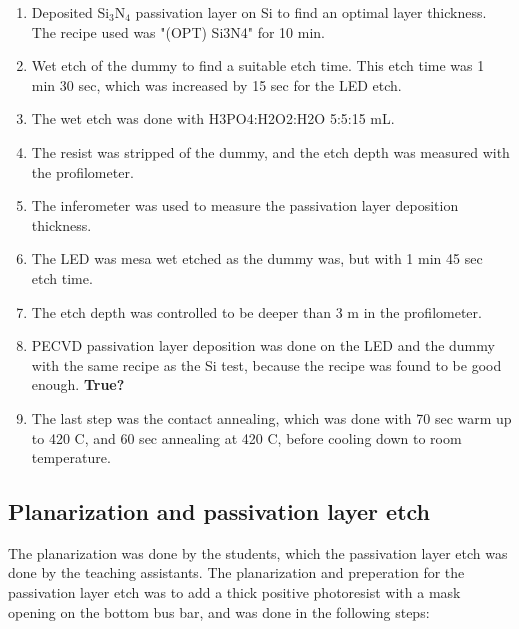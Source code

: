 \begin{enumerate}
    \item Deposited Si$_3$N$_4$ passivation layer on Si to find an optimal layer thickness. The recipe used was "(OPT) Si3N4" for 10 min.
    \item Wet etch of the dummy to find a suitable etch time. This etch time was 1 min 30 sec, which was increased by 15 sec for the LED etch.
    \item The wet etch was done with H3PO4:H2O2:H2O 5:5:15 mL.
    \item The resist was stripped of the dummy, and the etch depth was measured with the profilometer.
    \item The inferometer was used to measure the passivation layer deposition thickness.
    \item The LED was mesa wet etched as the dummy was, but with 1 min 45 sec etch time.
    \item The etch depth was controlled to be deeper than 3 \textmu m in the profilometer.
    \item PECVD passivation layer deposition was done on the LED and the dummy with the same recipe as the Si test, because the recipe was found to be good enough. \textbf{True?}
    \item The last step was the contact annealing, which was done with 70 sec warm up to 420 \textdegree C, and 60 sec annealing at 420 \textdegree C, before cooling down to room temperature.
\end{enumerate}






\subsection{Planarization and passivation layer etch}
\label{methods:Planarization}

The planarization was done by the students, which the passivation layer etch was done by the teaching assistants.
The planarization and preperation for the passivation layer etch was to add a thick positive photoresist with a mask opening on the bottom bus bar, and was done in the following steps:

